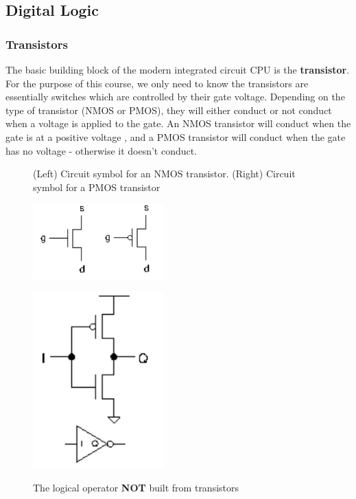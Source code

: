 \documentclass{article}
\begin{document}
	\subsection{Digital Logic}
	\subsubsection{Transistors}
	The basic building block of the modern integrated circuit CPU is the \textbf{transistor}. For the purpose of this course, we only need to know the transistors are essentially switches which are controlled by their gate voltage. Depending on the type of transistor (NMOS or PMOS), they will either conduct or not conduct when a voltage is applied to the gate. An NMOS transistor will conduct when the gate is at a positive voltage , and a PMOS transistor will conduct when the gate has no voltage - otherwise it doesn't conduct.
	
	\begin{figure}[h]
	\begin{minipage}[t]{.45\textwidth}
		\caption{(Left) Circuit symbol for an NMOS transistor.  (Right) Circuit symbol for a PMOS transistor}
		\vspace{15pt}
		\centering
		\includegraphics[width=0.45\textwidth]{transistors}
		\label{fig:transistors}
	\end{minipage}
	\hfill
	\begin{minipage}[t]{.45\textwidth}
		\caption{The logical operator \textbf{NOT} built from transistors}
		\vspace{15pt}
		\centering
		\includegraphics[width=0.45\textwidth]{not_gate_transistors}
		\label{fig:not_transistors}
	\end{minipage}
	\end{figure}
	
\end{document}
